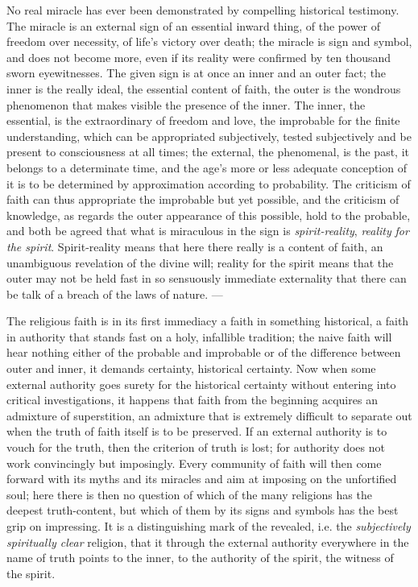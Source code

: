 \documentclass[12pt,a4paper,openany]{book}
\newcommand{\opage}[1]{\marginnote{\footnotesize\textit{[#1]}}}
\begin{document}
No real miracle has ever been demonstrated by compelling historical testimony. The
miracle is an external sign of an essential inward thing, of the power of freedom over
necessity, of life's victory over death; the miracle is sign and symbol, and does not
become more, even if its reality were confirmed by ten thousand sworn eyewitnesses. The
given sign is at once an inner and an outer fact; the inner is the really ideal, the
essential content of faith, the outer is the wondrous phenomenon that makes visible the
presence of the inner. The inner, the essential, is the extraordinary of freedom and
love, the improbable for the finite understanding, which can be appropriated
subjectively, tested subjectively and be present to consciousness at all times; the
external, the phenomenal, is the past, it belongs to a determinate time, and the age's
more or less adequate conception of it is to be determined by approximation according
to probability. The criticism of faith can thus appropriate
\setcounter{footnote}{0}%
\opage{213}the improbable but yet possible, and the criticism of knowledge, as regards the
outer appearance of this possible, hold to the probable, and both be agreed that what
is miraculous in the sign is \emph{spirit-reality}, \emph{reality}
\emph{for the spirit}. Spirit-reality means that here there really is a content of
faith, an unambiguous revelation of the divine will; reality for the spirit means that
the outer may not be held fast in so sensuously immediate externality that there can
be talk of a breach of the laws of nature. ---

The religious faith is in its first immediacy a faith in something historical, a faith
in authority that stands fast on a holy, infallible tradition; the naive faith will
hear nothing either of the probable and improbable or of the difference between outer
and inner, it demands certainty, historical certainty. Now when some external authority
goes surety for the historical certainty without entering into critical investigations,
it happens that faith from the beginning acquires an admixture of superstition, an
admixture that is extremely difficult to separate out when the truth of faith itself is
to be preserved. If an external authority is to vouch for the truth, then the criterion
of truth is lost; for authority does not work convincingly but imposingly. Every
community of faith will then come forward with its myths and its miracles and aim at
imposing on the unfortified soul; here there is then no question of which of the many
religions has the deepest truth-content, but which of them by its signs and symbols has
the best grip on impressing. It is a distinguishing mark of the revealed, i.e. the
\emph{subjectively}
\emph{spiritually clear} religion, that it through the external authority everywhere in
the name of truth points to the inner, to the authority of the spirit, the witness of
the spirit.
\end{document}
